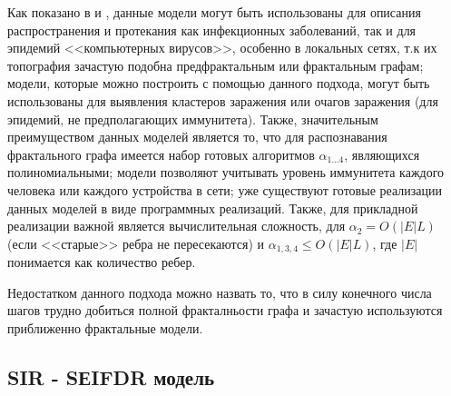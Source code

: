 Как показано в %
\cite{Bajaramukova:2014} и 
\cite{Utakaeva_disser:2011}, данные модели могут быть использованы для  описания распространения  и протекания как  инфекционных заболеваний, так и для эпидемий <<компьютерных вирусов>>, особенно в локальных сетях, т.к их топография зачастую подобна предфрактальным или фрактальным графам; модели, которые можно построить с помощью данного подхода, могут быть использованы для выявления кластеров заражения или очагов заражения (для эпидемий, не предполагающих иммунитета). Также, значительным преимуществом данных моделей является то, что для распознавания фрактального графа  имеется набор готовых алгоритмов $\alpha_{1...4}$, являющихся полиномиальными; модели позволяют учитывать уровень иммунитета каждого человека или каждого устройства в сети; уже существуют готовые реализации данных моделей в виде программных реализаций. Также, для прикладной реализации важной является   вычислительная сложность, для $\alpha_2 = O(|E|L)$ (если <<старые>> ребра не пересекаются) и  $\alpha_{1,3,4} \leqslant O(|E|L)$, где $|E|$ понимается как количество ребер. 

Недостатком данного подхода можно назвать то, что в силу конечного числа шагов трудно добиться полной фракталньости графа и зачастую используются приближенно фрактальные модели.


\subsection{SIR - SЕIFDR модель}

